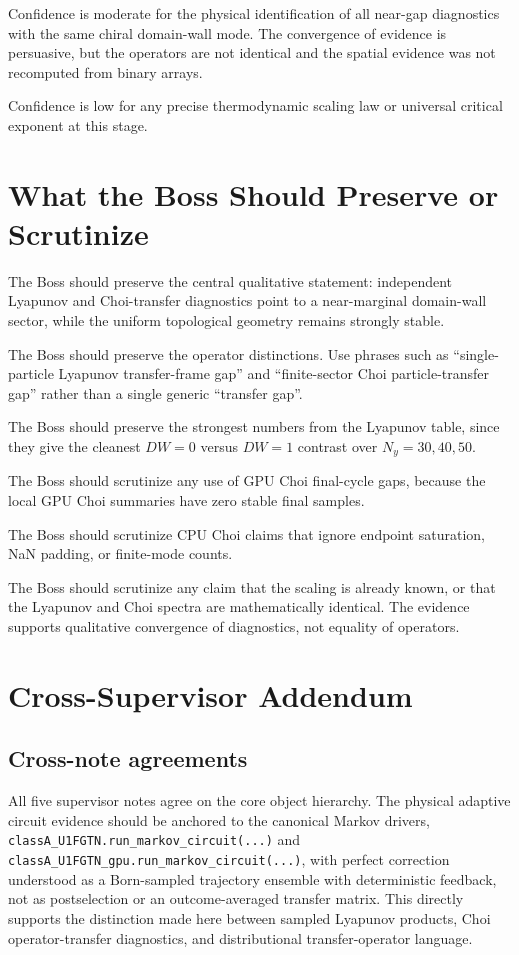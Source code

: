 \documentclass[aps,prb,onecolumn,nofootinbib,superscriptaddress]{revtex4-2}
\begin{document}
Confidence is moderate for the physical identification of all near-gap
diagnostics with the same chiral domain-wall mode.  The convergence of evidence
is persuasive, but the operators are not identical and the spatial evidence was
not recomputed from binary arrays.

Confidence is low for any precise thermodynamic scaling law or universal
critical exponent at this stage.

\section{What the Boss Should Preserve or Scrutinize}

The Boss should preserve the central qualitative statement: independent
Lyapunov and Choi-transfer diagnostics point to a near-marginal domain-wall
sector, while the uniform topological geometry remains strongly stable.

The Boss should preserve the operator distinctions.  Use phrases such as
``single-particle Lyapunov transfer-frame gap'' and ``finite-sector Choi
particle-transfer gap'' rather than a single generic ``transfer gap''.

The Boss should preserve the strongest numbers from the Lyapunov table, since
they give the cleanest \(DW=0\) versus \(DW=1\) contrast over
\(N_y=30,40,50\).

The Boss should scrutinize any use of GPU Choi final-cycle gaps, because the
local GPU Choi summaries have zero stable final samples.

The Boss should scrutinize CPU Choi claims that ignore endpoint saturation,
NaN padding, or finite-mode counts.

The Boss should scrutinize any claim that the scaling is already known, or that
the Lyapunov and Choi spectra are mathematically identical.  The evidence
supports qualitative convergence of diagnostics, not equality of operators.

\section{Cross-Supervisor Addendum}

\subsection{Cross-note agreements}

All five supervisor notes agree on the core object hierarchy.  The physical
adaptive circuit evidence should be anchored to the canonical Markov drivers,
\texttt{classA\_U1FGTN.run\_markov\_circuit(...)} and
\texttt{classA\_U1FGTN\_gpu.run\_markov\_circuit(...)}, with perfect correction
understood as a Born-sampled trajectory ensemble with deterministic feedback,
not as postselection or an outcome-averaged transfer matrix.  This directly
supports the distinction made here between sampled Lyapunov products, Choi
operator-transfer diagnostics, and distributional transfer-operator language.
\end{document}
